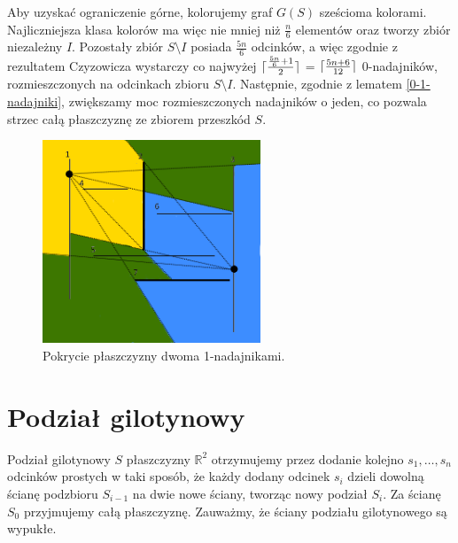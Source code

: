 \documentclass{xmgr}
\DeclarePairedDelimiter\ceil{\lceil}{\rceil}
\theoremstyle{definition}
\begin{document}
\indent Aby uzyskać ograniczenie górne, kolorujemy graf $G(S)$ sześcioma kolorami. Najliczniejsza klasa kolorów ma więc nie mniej niż $\frac{n}{6}$ elementów oraz tworzy zbiór niezależny $I$. Pozostały zbiór $S \setminus I$ posiada $\frac{5n}{6}$ odcinków, a więc zgodnie z rezultatem Czyzowicza wystarczy co najwyżej $\ceil{\frac{\frac{5n}{6} + 1}{2}}$ = $\ceil{\frac{5n+6}{12}}$ 0-nadajników, rozmieszczonych na odcinkach zbioru $S \setminus I$. Następnie, zgodnie z lematem \ref{0-1-nadajniki}, zwiększamy moc rozmieszczonych nadajników o jeden, co pozwala strzec całą płaszczyznę ze zbiorem przeszkód $S$.
\begin{figure}[ht!]
  \centering
  \includegraphics[width=6.5cm]{rysunki/pokrycie_nadajnikami.png}
  \caption{Pokrycie płaszczyzny dwoma 1-nadajnikami.}
  \label{fig:pokrycie plaszczyzny}
\end{figure} 

\section{Podział gilotynowy}
Podział gilotynowy $S$ płaszczyzny $\mathbb{R}^2$ otrzymujemy przez dodanie kolejno $s_1,\ldots,s_n$ odcinków prostych w taki sposób, że każdy dodany odcinek $s_i$ dzieli dowolną ścianę podzbioru $S_{i-1}$ na dwie nowe ściany, tworząc nowy podział $S_i$. Za ścianę $S_0$ przyjmujemy całą płaszczyznę. Zauważmy, że ściany podziału gilotynowego są wypukłe.
\end{document}
